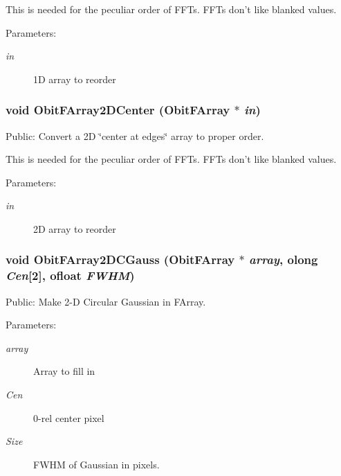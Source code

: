 This is needed for the peculiar order of FFTs. FFTs don't like blanked values. \begin{Desc}
\item[Parameters:]
\begin{description}
\item[{\em in}]1D array to reorder \end{description}
\end{Desc}
\subsubsection{\setlength{\rightskip}{0pt plus 5cm}void Obit\-FArray2DCenter ({\bf Obit\-FArray} $\ast$ {\em in})}\label{ObitFArray_8c_a60}


Public: Convert a 2D \char`\"{}center at edges\char`\"{} array to proper order. 

This is needed for the peculiar order of FFTs. FFTs don't like blanked values. \begin{Desc}
\item[Parameters:]
\begin{description}
\item[{\em in}]2D array to reorder \end{description}
\end{Desc}
\subsubsection{\setlength{\rightskip}{0pt plus 5cm}void Obit\-FArray2DCGauss ({\bf Obit\-FArray} $\ast$ {\em array}, {\bf olong} {\em Cen}[2], {\bf ofloat} {\em FWHM})}\label{ObitFArray_8c_a62}


Public: Make 2-D Circular Gaussian in FArray. 

\begin{Desc}
\item[Parameters:]
\begin{description}
\item[{\em array}]Array to fill in \item[{\em Cen}]0-rel center pixel \item[{\em Size}]FWHM of Gaussian in pixels. \end{description}
\end{Desc}
